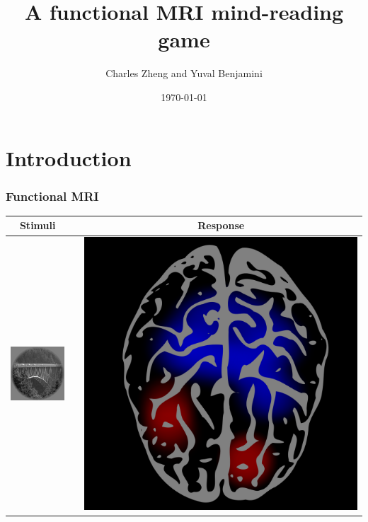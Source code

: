 \documentclass{beamer}
\title[Group talk]{A functional MRI mind-reading game}
\author{Charles Zheng and Yuval Benjamini} %
\institute[Stanford] %
{Stanford University}
\date{\today} %
\begin{document}
\begin{frame}
\titlepage %
\end{frame}

\section{Introduction}

\begin{frame}
\frametitle{Functional MRI}
\begin{center}
\begin{tabular}{ccc}
\hline
Stimuli & & Response\\ \hline
\includegraphics[scale = .52]{img1.png} & \hspace{1in} & \includegraphics[scale = 0.07]{brain1.png} \\ \hline

\end{tabular}
\end{center}
\end{frame}
\end{document}
